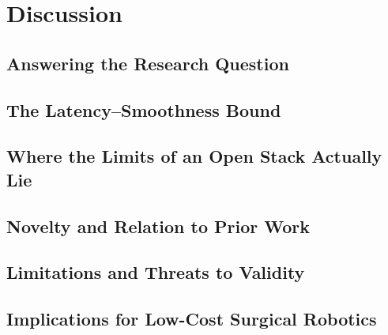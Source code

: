 \chapter{Discussion}
\label{ch:discussion}

\section{Answering the Research Question}
\label{sec:disc-answer}

\section{The Latency--Smoothness Bound}
\label{sec:disc-latency-bound}

\section{Where the Limits of an Open Stack Actually Lie}
\label{sec:disc-interfaces}

\section{Novelty and Relation to Prior Work}
\label{sec:disc-novelty}

\section{Limitations and Threats to Validity}
\label{sec:disc-limitations}

\section{Implications for Low-Cost Surgical Robotics}
\label{sec:disc-implications}
